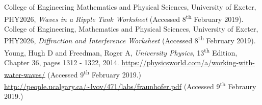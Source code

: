 \documentclass{article}
\begin{document}






\begin{thebibliography}{9}
 College of Engineering Mathematics and Physical Sciences, University of Exeter, PHY2026, \textit{Waves in a Ripple Tank Worksheet} (Accessed 8\textsuperscript{th} February 2019).
 College of Engineering, Mathematics and Physical Sciences, University of Exeter, PHY2026, \textit{Diffraction and Interference Worksheet} (Accessed 8\textsuperscript{th} February 2019).
 Young, Hugh D and Freedman, Roger A, \textit{University Physics}, 13\textsuperscript{th} Edition, Chapter 36, pages 1312 - 1322, 2014.
 \url{https://physicsworld.com/a/working-with-water-waves/} (Accessed 9\textsuperscript{th} February 2019.)
 \url{http://people.ucalgary.ca/~lvov/471/labs/fraunhofer.pdf} (Accessed 9\textsuperscript{th} Febraury 2019.)
\end{thebibliography}
\end{document}
